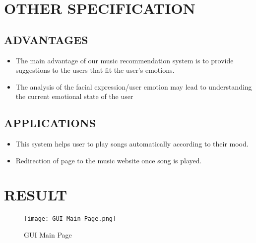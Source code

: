 \documentclass[12pt]{report}
\begin{document}
\clearpage


\centering
\section{OTHER SPECIFICATION}

\justifying
\setlength{\parindent}{4em}
\setlength{\parskip}{0.5em}
\renewcommand{\baselinestretch}{1.5}

\vspace{0.5cm}
\normalsize
\subsection{  ADVANTAGES}
\begin{itemize}
\item The main advantage of our music recommendation system is to provide 
suggestions to the users that fit the user's emotions.\\
\item The analysis of the facial expression/user emotion may lead to understanding the 
current emotional state of the user
\end{itemize}

\vspace{1.5cm}
\normalsize
\subsection{  APPLICATIONS}
\begin{itemize}
\item This system helps user to play songs automatically according to their mood.\\
\item Redirection of page to the music website once song is played.

\end{itemize}
\clearpage

\centering
\section{RESULT}

\justifying
\setlength{\parindent}{4em}
\setlength{\parskip}{0.5em}
\renewcommand{\baselinestretch}{1.5}
\vspace{1cm}

\begin{figure}[h]
\centering
\texttt{[image:   GUI Main Page.png]}
\caption{  GUI Main Page
}
\label{ GUI Main Page
}
\end{figure}
\end{document}
